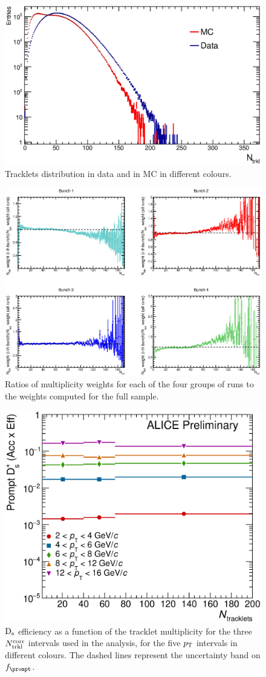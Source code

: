 \begin{figure}[h]
\centering
 \includegraphics[width=.7\textwidth]{FigCap6/NtrkDistrDDataMC.eps}
 \caption{Tracklets distribution in data and in MC in different colours.}
 \label{fig:NtrklDataMC}
\end{figure}

\begin{figure}[h]
\centering
 \includegraphics[width=.9\textwidth]{FigCap6/NtrkDistrMC_17d2a_EvWithD_zVxtUnCorr_896_897.eps}
 \caption{Ratios of multiplicity weights for each of the four groups of runs to the weights computed for the full sample.}
 \label{fig:RatioNtrklMC}
\end{figure}

\begin{figure}[h]
\centering
 \includegraphics[width=.5\textwidth]{FigCap6/PromptDsEfficiency_times_Acceptance_VsNtrkl.eps}
 \caption{${\rm D_s}$ efficiency as a function of the tracklet multiplicity for the three $N_{\rm trkl}^{\rm corr}$ intervals used in the analysis, for the five $p_{\rm T}$ intervals in different colours. The dashed lines represent the uncertainty band on $f_{\prompt}$.}
 \label{fig:DsEffVsMult}
\end{figure}



